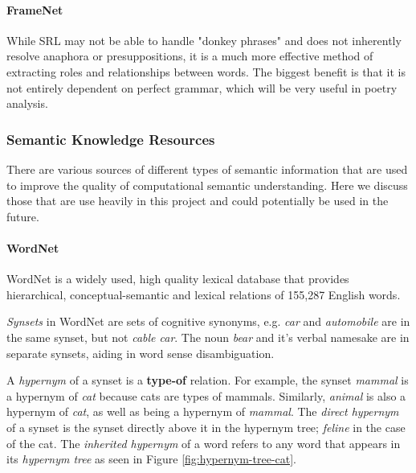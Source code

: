 \paragraph{FrameNet}

While SRL may not be able to handle "donkey phrases" and does not inherently resolve anaphora or presuppositions, it is a much more effective method of extracting roles and relationships between words. The biggest benefit is that it is not entirely dependent on perfect grammar, which will be very useful in poetry analysis.


\subsubsection{Semantic Knowledge Resources}
There are various sources of different types of semantic information that are used to improve the quality of computational semantic understanding. Here we discuss those that are use heavily in this project and could potentially be used in the future.

\paragraph{WordNet}
WordNet is a widely used, high quality lexical database that provides hierarchical, conceptual-semantic and lexical relations of 155,287 English words\cite{miller1995wordnet}. 

\textit{Synsets} in WordNet are sets of cognitive synonyms, e.g. \textit{car} and \textit{automobile} are in the same synset, but not \textit{cable car}. The noun \textit{bear} and it's verbal namesake are in separate synsets, aiding in word sense disambiguation.

A \textit{hypernym} of a synset is a \textbf{type-of} relation. For example, the synset \textit{mammal} is a hypernym of \textit{cat} because cats are types of mammals. Similarly, \textit{animal} is also a hypernym of \textit{cat}, as well as being a hypernym of \textit{mammal}. The \textit{direct hypernym} of a synset is the synset directly above it in the hypernym tree; \textit{feline} in the case of the cat. The \textit{inherited hypernym} of a word refers to any word that appears in its \textit{hypernym tree} as seen in Figure \ref{fig:hypernym-tree-cat}. 

